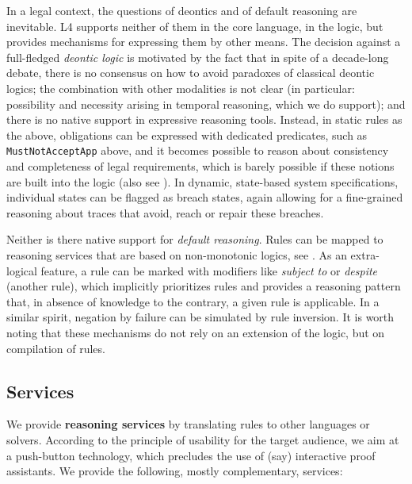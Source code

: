 \documentclass[runningheads]{llncs}
\begin{document}
In a legal context, the questions of deontics and of default reasoning are
inevitable. L4 supports neither of them in the core language, \ie{} in the logic, but
provides mechanisms for expressing them by other means. The decision against a
full-fledged \emph{deontic logic} is motivated by the fact that in spite of a
decade-long debate, there is no consensus on how to avoid paradoxes of
classical deontic logics; the combination with other modalities is not clear
(in particular: possibility and necessity arising in temporal reasoning, which
we do support); and there is no native support in expressive reasoning
tools. Instead, in static rules as the above, obligations can be expressed
with dedicated predicates, such as \texttt{MustNotAcceptApp} above, and it
becomes possible to reason about consistency and completeness of legal
requirements, which is barely possible if these notions are built into the
logic (also see ). In dynamic, state-based system
specifications, individual states can be flagged as breach states, again
allowing for a fine-grained reasoning about traces that avoid, reach or repair
these breaches.

Neither is there native support for \emph{default reasoning}. Rules can be
mapped to reasoning services that are based on non-monotonic logics, see
. As an extra-logical feature, a rule can be marked with
modifiers like \emph{subject to} or \emph{despite} (another rule), which
implicitly prioritizes rules and provides a reasoning pattern that, in absence
of knowledge to the contrary, a given rule is applicable. In a similar spirit,
negation by failure can be simulated by rule inversion. It is worth noting
that these mechanisms do not rely on an extension of the logic, but on
compilation of rules.

\subsection{Services}\label{sec:services}

We provide \textbf{reasoning services} by translating rules to other languages or
solvers. According to the principle of usability for the target audience, we
aim at a push-button technology, which precludes the use of (say) interactive
proof assistants. We provide the following, mostly complementary, services:
\end{document}
